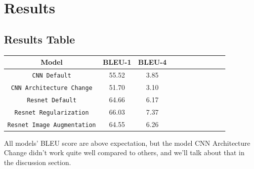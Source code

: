 \documentclass{article}
\begin{document}
    \section{Results}
    \subsection{Results Table}

    \begin{table}[H]
        \begin{tabular}{|c|c|c|c|c|c|c|c|c|c|c|}
            \hline
            Model                               & BLEU-1         & BLEU-4 \\
            \hline
            \texttt{CNN Default}                & 55.52          & 3.85   \\
            \hline
            \texttt{CNN Architecture Change}    & 51.70          & 3.10   \\
            \hline
            \texttt{Resnet Default}             & 64.66          & 6.17   \\
            \hline
            \texttt{Resnet Regularization}      & 66.03          & 7.37   \\
            \hline
            \texttt{Resnet Image Augmentation}  & 64.55          & 6.26\\
            \hline
        \end{tabular}
    \end{table}
    All models' BLEU score are above expectation, but the model CNN Architecture Change didn't work quite well compared to others, and we'll talk about that in the discussion section.
\end{document}
